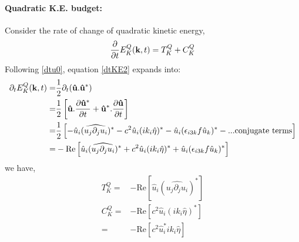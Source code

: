 \paragraph{Quadratic K.E. budget:}
Consider the rate of change of quadratic kinetic energy,
\begin{equation}\label{dtKE2}
 \pder{t}E_K^{Q}(\mathbf{k},t) = T_K^{Q} + C_K^{Q}
\end{equation}
Following \eqref{dtu0}, equation \eqref{dtKE2} expands into:
\begin{align*}
 \partial_t E_K^{Q}(\mathbf{k},t)
 =& \frac{1}{2}\partial_t(\mathbf{\hat u}.\mathbf{\hat u^*})\\
 =& \frac{1}{2}\left[ \mathbf{\hat u} .\pder[\mathbf{\hat u^*}]{t} 
		      + \mathbf{\hat u^*}. \pder[\mathbf{\hat u}]{t}\right]\\
 =& \frac{1}{2}\left[ -\hat{u}_i (\widehat{ u_j\partial_j u_i })^* 
    - c^2 \hat{u}_i (ik_i \hat{\eta})^* 
    - \hat{u}_i (\epsilon_{i3k} f \hat{u}_k)^*
    - ... \text{conjugate terms}
    \right]\\
 =& -\text{Re}\left[ \hat{u}_i (\widehat{ u_j\partial_j u_i })^* 
    + c^2 \hat{u}_i (ik_i \hat{\eta})^* 
    + \hat{u}_i (\epsilon_{i3k} f \hat{u}_k)^* \right]
\end{align*}
we have,
\begin{align}
 T_K^{Q}= &-\text{Re}\left[\hat{u}_i (\widehat{ u_j\partial_j u_i })^* 
	   \right]\\
 C_K^{Q}= &-\text{Re}\left[   c^2 \hat{u}_i (ik_i \hat{\eta})^*  \right]\\
 	= &-\text{Re}\left[   c^2 \hat{u}_i^* ik_i \hat{\eta} \right]
\end{align}

